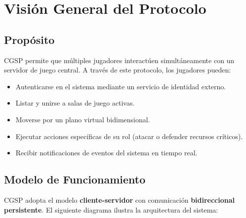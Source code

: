 \documentclass[12pt, letterpaper]{article}
\begin{document}
\section{Visión General del Protocolo}

\subsection{Propósito}

CGSP permite que múltiples jugadores interactúen simultáneamente con un servidor de
juego central. A través de este protocolo, los jugadores pueden:

\begin{itemize}[leftmargin=2em]
    \item Autenticarse en el sistema mediante un servicio de identidad externo.
    \item Listar y unirse a salas de juego activas.
    \item Moverse por un plano virtual bidimensional.
    \item Ejecutar acciones específicas de su rol (atacar o defender recursos críticos).
    \item Recibir notificaciones de eventos del sistema en tiempo real.
\end{itemize}

\subsection{Modelo de Funcionamiento}

CGSP adopta el modelo \textbf{cliente-servidor} con comunicación \textbf{bidireccional
persistente}. El siguiente diagrama ilustra la arquitectura del sistema:
\end{document}
